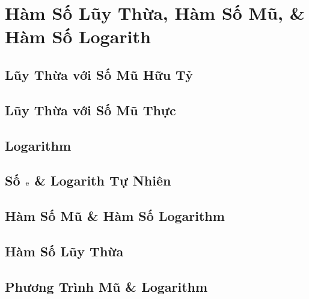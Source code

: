 \documentclass[oneside]{book}
\numberwithin{equation}{section}
\begin{document}

\chapter{Hàm Số Lũy Thừa, Hàm Số Mũ, \& Hàm Số Logarith}

\section{Lũy Thừa với Số Mũ Hữu Tỷ}


\section{Lũy Thừa với Số Mũ Thực}


\section{Logarithm}


\section{Số $\rm e$ \& Logarith Tự Nhiên}


\section{Hàm Số Mũ \& Hàm Số Logarithm}


\section{Hàm Số Lũy Thừa}


\section{Phương Trình Mũ \& Logarithm}
\end{document}
